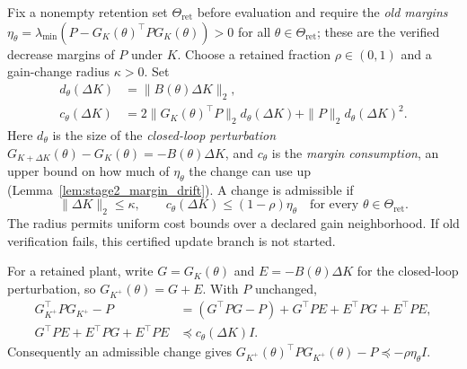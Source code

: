 \begin{definition}
\label{def:stage2_admissibility}
Fix a nonempty retention set $\Theta_{\mathrm{ret}}$ before evaluation and
require the \emph{old margins}
$\eta_\theta=\lambda_{\min}(P-G_K(\theta)^\top PG_K(\theta))>0$
for all $\theta\in\Theta_{\mathrm{ret}}$; these are the verified decrease
margins of $P$ under $K$. Choose a retained fraction
$\rho\in(0,1)$ and a gain-change radius $\kappa>0$. Set
\begin{align}
\label{eq:stage2_margin_consumption}
 d_\theta(\Delta K)&=\|B(\theta)\Delta K\|_2,\\
 c_\theta(\Delta K)&=2\|G_K(\theta)^\top P\|_2d_\theta(\Delta K)
                    +\|P\|_2d_\theta(\Delta K)^2.
\end{align}
Here $d_\theta$ is the size of the \emph{closed-loop perturbation}
$G_{K+\Delta K}(\theta)-G_K(\theta)=-B(\theta)\Delta K$, and $c_\theta$ is
the \emph{margin consumption}, an upper bound on how much of $\eta_\theta$
the change can use up (Lemma~\ref{lem:stage2_margin_drift}).
A change is admissible if
\begin{equation}
\label{eq:stage2_admissibility}
 \|\Delta K\|_2\le\kappa,\qquad
 c_\theta(\Delta K)\le(1-\rho)\eta_\theta
 \quad\text{for every }\theta\in\Theta_{\mathrm{ret}}.
\end{equation}
The radius permits uniform cost bounds over a declared gain neighborhood.
If old verification fails, this certified update branch is not started.
\end{definition}

\begin{lemma}
\label{lem:stage2_margin_drift}
For a retained plant, write $G=G_K(\theta)$ and
$E=-B(\theta)\Delta K$ for the closed-loop perturbation, so
$G_{K^+}(\theta)=G+E$. With $P$ unchanged,
\begin{align}
\label{eq:stage2_drift_expansion}
 G_{K^+}^\top PG_{K^+}-P
  &=(G^\top PG-P)+G^\top PE+E^\top PG+E^\top PE,\\
\label{eq:stage2_drift_bound}
 G^\top PE+E^\top PG+E^\top PE
  &\preceq c_\theta(\Delta K)I.
\end{align}
Consequently an admissible change gives
$G_{K^+}(\theta)^\top PG_{K^+}(\theta)-P
\preceq-\rho\eta_\theta I$.
\end{lemma}

